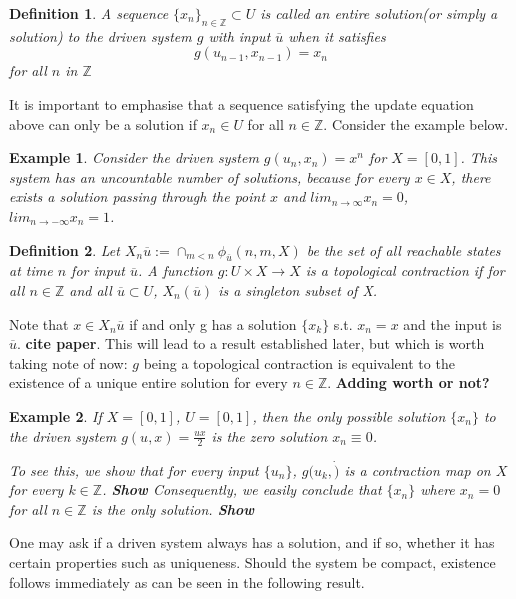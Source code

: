 \documentclass[12 pt]{article}
\newtheorem{Definition}{Definition}[]
\newtheorem{Example}{Example}[]
\begin{document}
\begin{Definition}
  A sequence $\{x_n\}_{n\in\mathbb{Z}}\subset{U}$ is called an entire solution(or simply a solution) to the driven system  $g$ with input $\overline{u}$ when it satisfies 
  $$g(u_{n-1}, x_{n-1})=x_n$$ for all $n$ in $\mathbb{Z}$
\end{Definition}

It is important to emphasise that a sequence satisfying the update equation above can only be a solution if $x_n\in{U}$ for all $n\in\mathbb{Z}$. Consider the example below.

\begin{Example}
  Consider the driven system $g(u_n,x_n)=x^n$ for $X=[0,1]$. This system has an uncountable number of solutions, because for every $x\in{X}$, there exists a solution passing through the point $x$ and $lim_{n\to\infty}x_n=0$, $lim_{n\to{-}\infty}x_n=1$.
\end{Example}

\begin{Definition}
Let $X_n{\overline{u}}:= \cap_{m<n}{\phi_{\overline{u}}(n,m,X)}$ be the set of all reachable states at time $n$ for input $\overline{u}$.
  A function $g:U\times{X}\to{X}$ is a topological contraction if for all $n\in\mathbb{Z}$ and all $\overline{u}\subset{U}$, $X_n(\overline{u})$ is a singleton subset of X.  
\end{Definition}

Note that $x\in{X_n{\overline{u}}}$ if and only g has a solution $\{x_k\}$ s.t. $x_n=x$ and the input is $\overline{u}$. \textbf{cite paper}. This will lead to a result established later, but which is worth taking note of now: $g$ being a topological contraction is equivalent to the existence of a unique entire solution for every $n\in\mathbb{Z}$. \textbf{Adding worth or not?} \label{here_UAP_firstestablished}

\begin{Example}\label{ex_halfux}
  If $X=[0,1]$, $U=[0,1]$, then the only possible solution $\{x_n\}$ to the driven system $g(u,x)=\frac{ux}{2}$ is the zero solution $x_n\equiv0$.

  To see this, we show that for every input $\{u_n\}$, $g(u_k,\dot)$ is a contraction map on $X$ for every $k\in\mathbb{Z}$. \textbf{Show}
  Consequently, we easily conclude that $\{x_n\}$ where $x_n=0$ for all $n\in\mathbb{Z}$ is the only solution. \textbf{Show}
\end{Example}

One may ask if a driven system always has a solution, and if so, whether it has certain properties such as uniqueness. Should the system be compact, existence follows immediately as can be seen in the following result.
\end{document}
